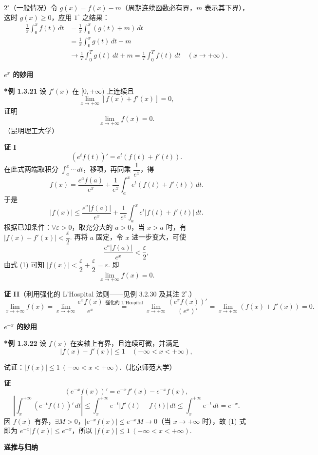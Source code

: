 \documentclass[UTF8,12pt,a4paper,fontset=fandol]{ctexart}
\begin{document}
$2^\circ$（一般情况）令 $g(x)=f(x)-m$（周期连续函数必有界，$m$ 表示其下界），这时
$g(x)\ge0$，应用 $1^\circ$ 之结果：
\[
\begin{aligned}
\frac1x\int_0^xf(t)\,dt
&=\frac1x\int_0^x(g(t)+m)\,dt\\
&=\frac1x\int_0^xg(t)\,dt+m\\
&\to\frac1T\int_0^Tg(t)\,dt+m
=\frac1T\int_0^Tf(t)\,dt
\quad(x\to+\infty).
\end{aligned}
\]

\noindent\textbf{$e^x$ 的妙用}

\noindent\textbf{*例 1.3.21}\quad
设 $f'(x)$ 在 $[0,+\infty)$ 上连续且
\[
  \lim_{x\to+\infty}[f(x)+f'(x)]=0,
\]
证明
\[
  \lim_{x\to+\infty}f(x)=0.
\]
（昆明理工大学）

\noindent\textbf{证 I}\quad
\[
  (e^tf(t))'=e^t(f(t)+f'(t)).
\]
在此式两端取积分 $\int_a^x\cdots\,dt$，移项，再同乘 $\dfrac1{e^x}$，得
\[
  f(x)=\frac{e^af(a)}{e^x}
  +\frac1{e^x}\int_a^xe^t(f(t)+f'(t))\,dt.
\]
于是
\[
  |f(x)|\le
  \frac{e^a|f(a)|}{e^x}
  +\frac1{e^x}\int_a^xe^t|f(t)+f'(t)|\,dt.
  \tag{1}
\]
根据已知条件：$\forall\varepsilon>0$，取充分大的 $a>0$，当 $x>a$ 时，有
$|f(x)+f'(x)|<\dfrac\varepsilon2$. 再将 $a$ 固定，令 $x$ 进一步变大，可使
\[
  \frac{e^a|f(a)|}{e^x}<\frac\varepsilon2,
\]
由式 (1) 可知 $|f(x)|<\dfrac\varepsilon2+\dfrac\varepsilon2=\varepsilon$. 即
\[
  \lim_{x\to+\infty}f(x)=0.
\]

\noindent\textbf{证 II}\quad （利用强化的 L'Hospital 法则——见例 3.2.30 及其注 $2^\circ$.）
\[
  \lim_{x\to+\infty}f(x)
  =\lim_{x\to+\infty}\frac{e^xf(x)}{e^x}
  \stackrel{\text{强化的 L'Hospital}}{=}
  \lim_{x\to+\infty}\frac{(e^xf(x))'}{(e^x)'}
  =\lim_{x\to+\infty}(f(x)+f'(x))=0.
\]

\noindent\textbf{$e^{-x}$ 的妙用}

\noindent\textbf{*例 1.3.22}\quad
设 $f(x)$ 在实轴上有界，且连续可微，并满足
\[
  |f(x)-f'(x)|\le1\quad(-\infty<x<+\infty),
\]

试证：$|f(x)|\le1\ (-\infty<x<+\infty)$.（北京师范大学）

\noindent\textbf{证}\quad
\[
  (e^{-x}f(x))'=e^{-x}f'(x)-e^{-x}f(x),
\]
\[
  \left|\int_x^{+\infty}(e^{-t}f(t))'\,dt\right|
  \le\int_x^{+\infty}e^{-t}|f'(t)-f(t)|\,dt
  \le\int_x^{+\infty}e^{-t}\,dt=e^{-x}. \tag{1}
\]
因 $f(x)$ 有界，$\exists M>0$，$|e^{-x}f(x)|\le e^{-x}M\to0$（当 $x\to+\infty$ 时），故 (1) 式即为
$e^{-x}|f(x)|\le e^{-x}$，所以 $|f(x)|\le1\ (-\infty<x<+\infty)$.

\noindent\textbf{递推与归纳}
\end{document}
